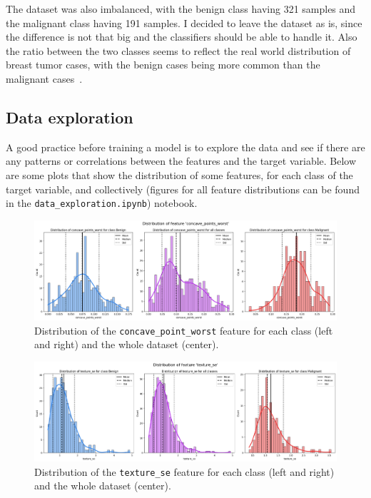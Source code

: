\documentclass[12pt]{article}
\begin{document}
The dataset was also imbalanced, with the benign class having 321 samples and
the malignant class having 191 samples. I decided to leave the dataset as is,
since the difference is not that big and the classifiers should be able to
handle it. Also the ratio between the two classes seems to reflect the real
world distribution of breast tumor cases, with the benign cases being more
common than the malignant cases~\cite{%
Ugiagbe_Olu-Eddo_2011,Bhathal_Brown_Lesueur_Russell_1985}.


\subsection{Data exploration}

A good practice before training a model is to explore the data and see if there
are any patterns or correlations between the features and the target variable.
Below are some plots that show the distribution of some features, for each class
of the target variable, and collectively (figures for all feature distributions
can be found in the \texttt{data\_exploration.ipynb}) notebook.

\begin{figure}[H]
    \centering
    \includegraphics[width=\textwidth]{ims/concave_points_worst.png}
    \caption{Distribution of the \texttt{concave\_point\_worst} feature for each
    class (left and right) and the whole dataset (center).}
    \label{fig:area_worst}
\end{figure}

\begin{figure}[H]
    \centering
    \includegraphics[width=\textwidth]{ims/texture_se.png}
    \caption{Distribution of the \texttt{texture\_se} feature for each class
    (left and right) and the whole dataset (center).}
    \label{fig:concave_points_se}
\end{figure}
\end{document}
